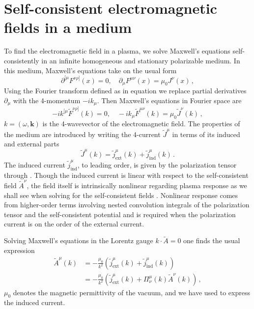 \section{Self-consistent electromagnetic fields in a medium}\label{sec:Maxwell}
To find the electromagnetic field in a plasma, we solve Maxwell's equations self-consistently in an infinite homogeneous and stationary polarizable medium. In this medium, Maxwell's equations take on the usual form \cite{melrose2008quantum}
\begin{equation}
\partial^{[\mu}F^{\nu \rho]}(x) =0, \quad \partial_{\mu}F^{\mu \nu}(x) = \mu_0 J^{\nu}(x)\,,
\end{equation}
Using the Fourier transform defined as in equation  we replace partial derivatives $\partial_\mu$ with the 4-momentum $-i k_\mu$. Then Maxwell's equations in Fourier space are
\begin{equation}
-i k^{[\mu}\widetilde{F}^{\nu \rho]}(k) =0, \quad -i k_{\mu}\widetilde{F}^{\mu \nu}(k) = \mu_0 \widetilde{J}^{\nu}(k)\,,
\end{equation}
$k=(\omega, \boldsymbol{k})$ is the 4-wavevector of the electromagnetic field. The properties of the medium are introduced by writing the 4-current $\widetilde{J}^{\mu}$ in terms of its induced and external parts
\begin{equation}
 \widetilde{J}^{\mu}(k) = \widetilde{j}_{\mathrm{ext}}^{\mu}(k)+ \widetilde{j}_{\mathrm{ind}}^{\mu}(k)\,.
\end{equation}
The induced current $\widetilde{j}_{\mathrm{ind}}^{\mu}$, to leading order, is given by the polarization tensor through . Though the induced current is linear with respect to the self-consistent field $\widetilde{A}^{\nu}$, the field itself is intrinsically nonlinear regarding plasma response as we shall see when solving for the self-consistent fields . Nonlinear response comes from higher-order terms involving nested convolution integrals of the polarization tensor and the self-consistent potential and is required when the polarization current is on the order of the external current.

Solving Maxwell's equations in the Lorentz gauge $k \cdot \widetilde{A}=0$ one finds the usual expression
\begin{equation}\label{eq:Amu}
\begin{split}
\widetilde{A}^{\mu}(k)&= -\frac{\mu_0}{k^2}\left(\widetilde{j}_{\mathrm{ext}}^{\mu}(k)+ \widetilde{j}_{\mathrm{ind}}^{\mu}(k)\right)\\
&= -\frac{\mu_0}{k^2}\left(\widetilde{j}_{\mathrm{ext}}^{\mu}(k)+  \Pi^\mu_\nu(k) \widetilde{A}^\nu(k)\right)\,,
\end{split}
\end{equation}
$\mu_0$ denotes the magnetic permittivity of the vacuum, and we have used  to express the induced current. 

